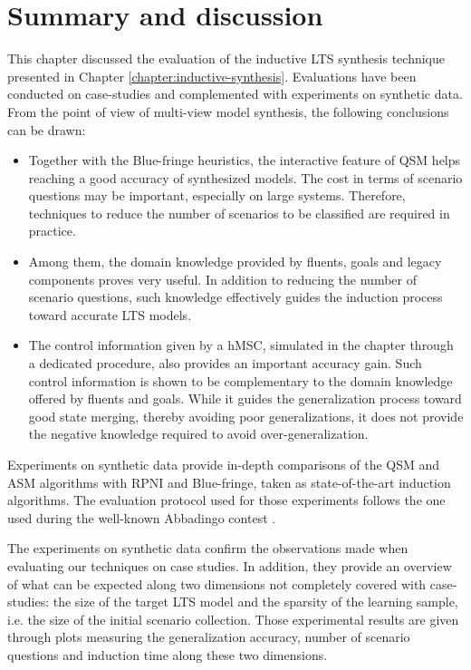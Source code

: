 \section{Summary and discussion\label{section:evaluation-summary}}

This chapter discussed the evaluation of the inductive LTS synthesis technique presented in Chapter \ref{chapter:inductive-synthesis}. Evaluations have been conducted on case-studies and complemented with experiments on synthetic data. From the point of view of multi-view model synthesis, the following conclusions can be drawn:
\begin{itemize}
\item Together with the Blue-fringe heuristics, the interactive feature of QSM helps reaching a good accuracy of synthesized models. The cost in terms of scenario questions may be important, especially on large systems. Therefore, techniques to reduce the number of scenarios to be classified are required in practice.
\item Among them, the domain knowledge provided by fluents, goals and legacy components proves very useful. In addition to reducing the number of scenario questions, such knowledge effectively guides the induction process toward accurate LTS models. 
\item The control information given by a hMSC, simulated in the chapter through a dedicated procedure, also provides an important accuracy gain. Such control information is shown to be complementary to the domain knowledge offered by fluents and goals. While it guides the generalization process toward good state merging, thereby avoiding poor generalizations, it does not provide the negative knowledge required to avoid over-generalization.
\end{itemize}

Experiments on synthetic data provide in-depth comparisons of the QSM and ASM algorithms with RPNI and Blue-fringe, taken as state-of-the-art induction algorithms. The evaluation protocol used for those experiments follows the one used during the well-known Abbadingo contest \cite{Lang:1998}. 

The experiments on synthetic data confirm the observations made when evaluating our techniques on case studies. In addition, they provide an overview of what can be expected along two dimensions not completely covered with case-studies: the size of the target LTS model and the sparsity of the learning sample, i.e. the size of the initial scenario collection. Those experimental results are given through plots measuring the generalization accuracy, number of scenario questions and induction time along these two dimensions.

